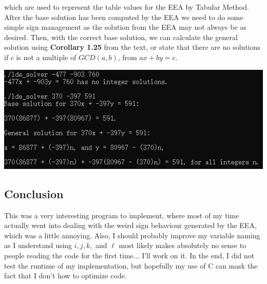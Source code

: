 \documentclass{article}
\begin{document}
\noindent which are used to represent the table values for the EEA by Tabular Method.
After the base solution has been
computed by the EEA we need to do some simple sign management as the solution from the EEA may
not always be as desired. Then, with the correct base solution, we can calculate the general solution using
\textbf{Corollary 1.25} from the text, or state that there are no solutions if $c$ is not a multiple of $GCD(a,b)$,
from $ax + by = c$.
\begin{center}
  \includegraphics[scale=0.9]{example.PNG}
\end{center}
\subsection{Conclusion}
This was a very interesting program to implement, where most of my time actually went into dealing with
the weird sign
behaviour generated by the EEA, which was a little annoying.
Also, I should probably improve my variable naming as I understand using $i,j,k,$ and $\ell$
most likely makes absolutely no sense to people reading the code for the first time... I'll work on it. 
In the end, I did not test the runtime of my implementation,
but hopefully my use of C can mask the fact that I don't how to optimize code.
\end{document}
